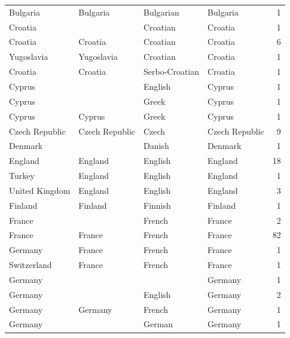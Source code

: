 \documentclass{article}
\begin{document}
\begin{table}[!htp]
\begin{center}
\begin{tabular}{|l|l|l||l|r|}
        Bulgaria &       Bulgaria &        Bulgarian &       Bulgaria &    1 \\
         Croatia &                &         Croatian &        Croatia &    1 \\
         Croatia &        Croatia &         Croatian &        Croatia &    6 \\
      Yugoslavia &     Yugoslavia &         Croatian &        Croatia &    1 \\
         Croatia &        Croatia &   Serbo-Croatian &        Croatia &    1 \\
          Cyprus &                &          English &         Cyprus &    1 \\
          Cyprus &                &            Greek &         Cyprus &    1 \\
          Cyprus &         Cyprus &            Greek &         Cyprus &    1 \\
  Czech Republic & Czech Republic &            Czech & Czech Republic &    9 \\
         Denmark &                &           Danish &        Denmark &    1 \\
         England &        England &          English &        England &   18 \\
          Turkey &        England &          English &        England &    1 \\
  United Kingdom &        England &          English &        England &    3 \\
         Finland &        Finland &          Finnish &        Finland &    1 \\
          France &                &           French &         France &    2 \\
          France &         France &           French &         France &   82 \\
         Germany &         France &           French &         France &    1 \\
     Switzerland &         France &           French &         France &    1 \\
         Germany &                &                  &        Germany &    1 \\
         Germany &                &          English &        Germany &    2 \\
         Germany &        Germany &           French &        Germany &    1 \\
         Germany &                &           German &        Germany &    1 \\

\end{tabular}
\end{center}
\end{table}
\end{document}
